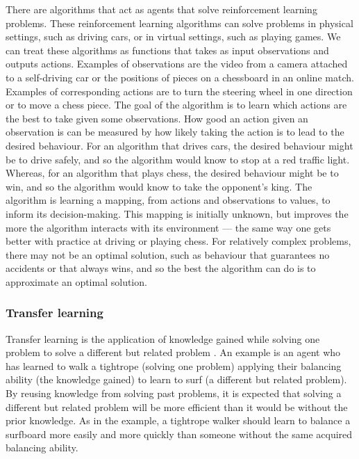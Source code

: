 \documentclass[12pt,a4paper]{article}
\begin{document}
There are algorithms that act as agents that solve reinforcement learning problems. These reinforcement learning algorithms can solve problems in physical settings, such as driving cars, or in virtual settings, such as playing games. We can treat these algorithms as functions that takes as input observations and outputs actions. Examples of observations are the video from a camera attached to a self-driving car or the positions of pieces on a chessboard in an online match. Examples of corresponding actions are to turn the steering wheel in one direction or to move a chess piece. The goal of the algorithm is to learn which actions are the best to take given some observations. How good an action given an observation is can be measured by how likely taking the action is to lead to the desired behaviour. For an algorithm that drives cars, the desired behaviour might be to drive safely, and so the algorithm would know to stop at a red traffic light. Whereas, for an algorithm that plays chess, the desired behaviour might be to win, and so the algorithm would know to take the opponent's king. The algorithm is learning a mapping, from actions and observations to values, to inform its decision-making. This mapping is initially unknown, but improves the more the algorithm interacts with its environment --- the same way one gets better with practice at driving or playing chess. For relatively complex problems, there may not be an optimal solution, such as behaviour that guarantees no accidents or that always wins, and so the best the algorithm can do is to approximate an optimal solution. 

\subsubsection{Transfer learning}
Transfer learning is the application of knowledge gained while solving one problem to solve a different but related problem \cite{2010}. An example is an agent who has learned to walk a tightrope (solving one problem) applying their balancing ability (the knowledge gained) to learn to surf (a different but related problem). By reusing knowledge from solving past problems, it is expected that solving a different but related problem will be more efficient than it would be without the prior knowledge. As in the example, a tightrope walker should learn to balance a surfboard more easily and more quickly than someone without the same acquired balancing ability. 
\end{document}
